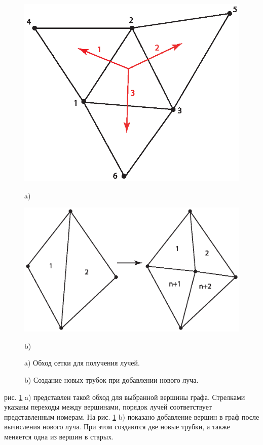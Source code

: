 \documentclass[12pt, cleqn, a4paper]{article}
\begin{document}
\begin{figure}[h!]
\begin{minipage}[h!]{0.39\linewidth}
\centering
\includegraphics[width=1.2\linewidth]{grid_bfs.eps}
\caption*{a)}
\end{minipage}
\hfill
\begin{minipage}[h!]{0.59\linewidth}
\centering
\includegraphics[width=1.1\linewidth]{grid_rebinding.eps}
\caption*{b)}
\end{minipage}
\caption{\quad a) Обход сетки для получения лучей.}
\caption*{b) Создание новых трубок при добавлении нового луча.}
\label{fig:grid}
\end{figure}

 рис. \ref{fig:grid} a) представлен такой обход для выбранной вершины графа. Стрелками указаны переходы между вершинами, порядок лучей соответствует представленным номерам. На рис. \ref{fig:grid} b) показано добавление вершин в граф после вычисления нового луча. При этом создаются две новые трубки, а также меняется одна из вершин в старых.
\end{document}
